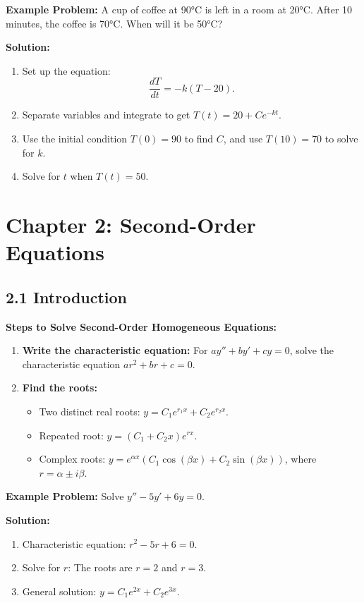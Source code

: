 \documentclass[10pt]{article}
\begin{document}
\textbf{Example Problem:} A cup of coffee at 90°C is left in a room at 20°C. After 10 minutes, the coffee is 70°C. When will it be 50°C?

\textbf{Solution:}
\begin{enumerate}
    \item Set up the equation:
    \[
    \frac{dT}{dt} = -k(T - 20).
    \]
    \item Separate variables and integrate to get \( T(t) = 20 + Ce^{-kt} \).
    \item Use the initial condition \( T(0) = 90 \) to find \( C \), and use \( T(10) = 70 \) to solve for \( k \).
    \item Solve for \( t \) when \( T(t) = 50 \).
\end{enumerate}

\section*{Chapter 2: Second-Order Equations}

\subsection*{2.1 Introduction}
\textbf{Steps to Solve Second-Order Homogeneous Equations:}
\begin{enumerate}
    \item \textbf{Write the characteristic equation:} For \( ay'' + by' + cy = 0 \), solve the characteristic equation \( ar^2 + br + c = 0 \).
    \item \textbf{Find the roots:}
    \begin{itemize}
        \item Two distinct real roots: \( y = C_1 e^{r_1 x} + C_2 e^{r_2 x} \).
        \item Repeated root: \( y = (C_1 + C_2 x) e^{r x} \).
        \item Complex roots: \( y = e^{\alpha x}(C_1 \cos(\beta x) + C_2 \sin(\beta x)) \), where \( r = \alpha \pm i\beta \).
    \end{itemize}
\end{enumerate}

\textbf{Example Problem:} Solve \( y'' - 5y' + 6y = 0 \).

\textbf{Solution:}
\begin{enumerate}
    \item Characteristic equation: \( r^2 - 5r + 6 = 0 \).
    \item Solve for \( r \): The roots are \( r = 2 \) and \( r = 3 \).
    \item General solution: \( y = C_1 e^{2x} + C_2 e^{3x} \).
\end{enumerate}
\end{document}
